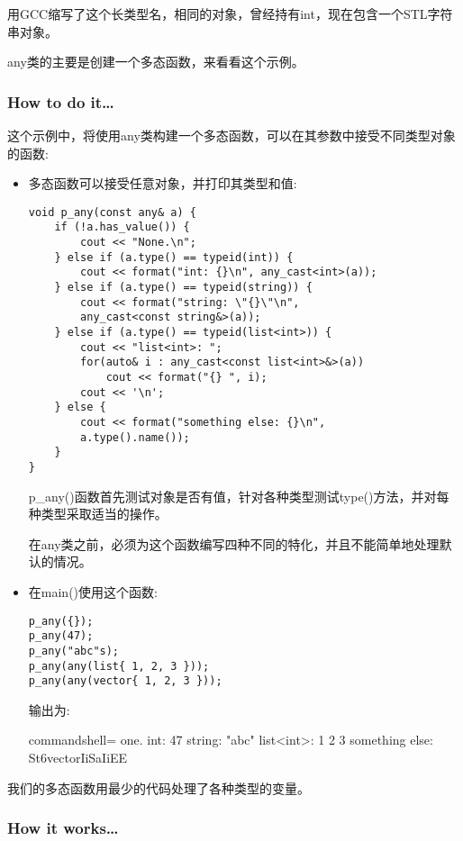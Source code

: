 用GCC缩写了这个长类型名，相同的对象，曾经持有int，现在包含一个STL字符串对象。

any类的主要是创建一个多态函数，来看看这个示例。

\subsubsection{How to do it…}

这个示例中，将使用any类构建一个多态函数，可以在其参数中接受不同类型对象的函数:

\begin{itemize}
\item 
多态函数可以接受任意对象，并打印其类型和值:

\begin{lstlisting}[style=styleCXX]
void p_any(const any& a) {
	if (!a.has_value()) {
		cout << "None.\n";
	} else if (a.type() == typeid(int)) {
		cout << format("int: {}\n", any_cast<int>(a));
	} else if (a.type() == typeid(string)) {
		cout << format("string: \"{}\"\n",
		any_cast<const string&>(a));
	} else if (a.type() == typeid(list<int>)) {
		cout << "list<int>: ";
		for(auto& i : any_cast<const list<int>&>(a))
			cout << format("{} ", i);
		cout << '\n';
	} else {
		cout << format("something else: {}\n",
		a.type().name());
	}
}
\end{lstlisting}

p\_any()函数首先测试对象是否有值，针对各种类型测试type()方法，并对每种类型采取适当的操作。

在any类之前，必须为这个函数编写四种不同的特化，并且不能简单地处理默认的情况。

\item 
在main()使用这个函数:

\begin{lstlisting}[style=styleCXX]
p_any({});
p_any(47);
p_any("abc"s);
p_any(any(list{ 1, 2, 3 }));
p_any(any(vector{ 1, 2, 3 }));
\end{lstlisting}

输出为:

\begin{tcblisting}{commandshell={}}
one.
int: 47
string: "abc"
list<int>: 1 2 3
something else: St6vectorIiSaIiEE
\end{tcblisting}

\end{itemize}

我们的多态函数用最少的代码处理了各种类型的变量。

\subsubsection{How it works…}

